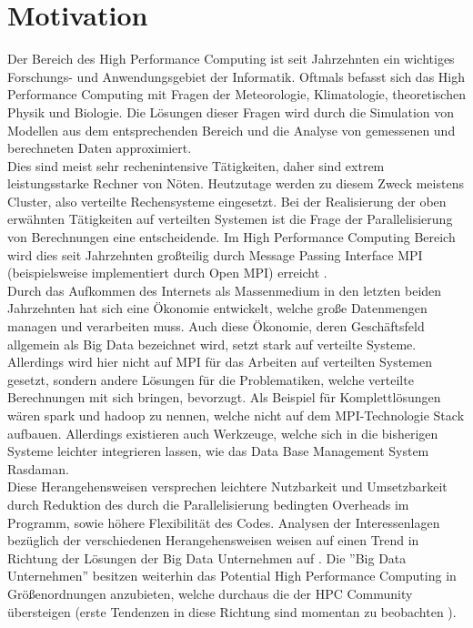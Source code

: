 \documentclass[
	12pt,
	a4paper,
	BCOR10mm,
	DIV14,
	listof=totoc,
	bibliography=totoc,
	headsepline
]{scrreprt}
\begin{document}
\section{Motivation}
Der Bereich des High Performance Computing ist seit Jahrzehnten ein wichtiges Forschungs- und Anwendungsgebiet der Informatik.
Oftmals befasst sich das High Performance Computing mit Fragen der Meteorologie, Klimatologie, theoretischen Physik und Biologie.
Die Lösungen dieser Fragen wird durch die Simulation von Modellen aus dem entsprechenden Bereich und die Analyse von gemessenen und berechneten Daten approximiert. \\
Dies sind meist sehr rechenintensive Tätigkeiten, daher sind extrem leistungsstarke Rechner von Nöten.
Heutzutage werden zu diesem Zweck meistens Cluster, also verteilte Rechensysteme eingesetzt.
Bei der Realisierung der oben erwähnten Tätigkeiten auf verteilten Systemen ist die Frage der Parallelisierung von Berechnungen eine entscheidende. 
Im High Performance Computing Bereich wird dies seit Jahrzehnten großteilig durch Message Passing Interface MPI (beispielsweise implementiert durch Open MPI) erreicht \cite{HLR}. \\
Durch das Aufkommen des Internets als Massenmedium in den letzten beiden Jahrzehnten hat sich eine Ökonomie entwickelt, welche große Datenmengen managen und verarbeiten muss.
Auch diese Ökonomie, deren Geschäftsfeld allgemein als Big Data bezeichnet wird, setzt stark auf verteilte Systeme.
Allerdings wird hier nicht auf MPI für das Arbeiten auf verteilten Systemen gesetzt, sondern andere Lösungen für die Problematiken, welche verteilte Berechnungen mit sich bringen, bevorzugt.
Als Beispiel für Komplettlösungen wären spark und hadoop zu nennen, welche nicht auf dem MPI-Technologie Stack aufbauen. 
Allerdings existieren auch Werkzeuge, welche sich in die bisherigen Systeme leichter integrieren lassen, wie das Data Base Management System Rasdaman. \\
Diese Herangehensweisen versprechen leichtere Nutzbarkeit und Umsetzbarkeit durch Reduktion des durch die Parallelisierung bedingten Overheads im Programm, sowie höhere Flexibilität des Codes.
Analysen der Interessenlagen bezüglich der verschiedenen Herangehensweisen weisen auf einen Trend in Richtung der Lösungen der Big Data Unternehmen auf \cite{hpcDies}.
Die ''Big Data Unternehmen'' besitzen weiterhin das Potential High Performance Computing in Größenordnungen anzubieten, welche durchaus die der HPC Community übersteigen (erste Tendenzen in diese Richtung sind momentan zu beobachten \cite{HLR}). \\
\end{document}
